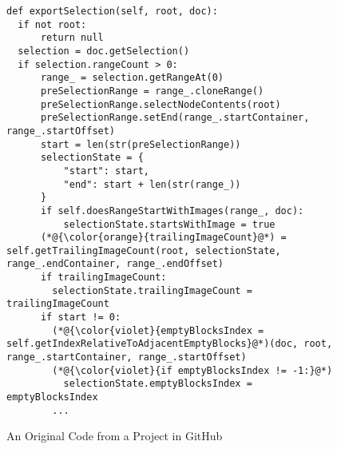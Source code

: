 \begin{figure}[t]
	\centering
	\begin{lstlisting}[]
def exportSelection(self, root, doc):
  if not root: 
      return null
  selection = doc.getSelection()
  if selection.rangeCount > 0:
      range_ = selection.getRangeAt(0)
      preSelectionRange = range_.cloneRange()
      preSelectionRange.selectNodeContents(root)
      preSelectionRange.setEnd(range_.startContainer, range_.startOffset)
      start = len(str(preSelectionRange))
      selectionState = {
          "start": start,
          "end": start + len(str(range_))
      }
      if self.doesRangeStartWithImages(range_, doc):
          selectionState.startsWithImage = true
      (*@{\color{orange}{trailingImageCount}@*) = self.getTrailingImageCount(root, selectionState, range_.endContainer, range_.endOffset)
      if trailingImageCount:
        selectionState.trailingImageCount = trailingImageCount
      if start != 0:
        (*@{\color{violet}{emptyBlocksIndex = self.getIndexRelativeToAdjacentEmptyBlocks}@*)(doc, root, range_.startContainer, range_.startOffset)
        (*@{\color{violet}{if emptyBlocksIndex != -1:}@*) 
          selectionState.emptyBlocksIndex = emptyBlocksIndex
        ...
        \end{lstlisting}
\vspace{-15pt}
\caption{An Original Code from a Project in GitHub}
\label{example_org}
\end{figure}
